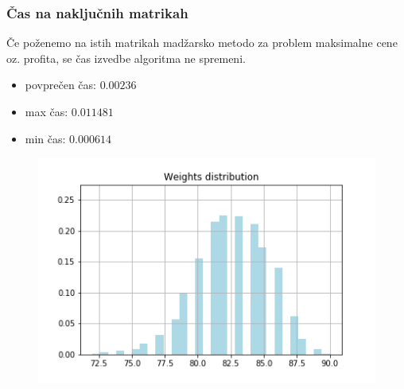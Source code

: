 \documentclass{beamer}
\begin{document}
\begin{frame}
    \frametitle{Čas na naključnih matrikah}
    \begin{block}{}
        Če poženemo na istih matrikah madžarsko metodo za problem maksimalne cene oz.
        profita, se čas izvedbe algoritma ne spremeni.
        \begin{itemize}
            \item povprečen čas: $0.00236$
            \item max čas: $0.011481$
            \item min čas: $0.000614$
        \end{itemize}
    \end{block}
    \begin{figure}[htbp]
        \centerline{\includegraphics[scale=0.40]{picture1011max.png}}
    \end{figure}
\end{frame}
\end{document}
